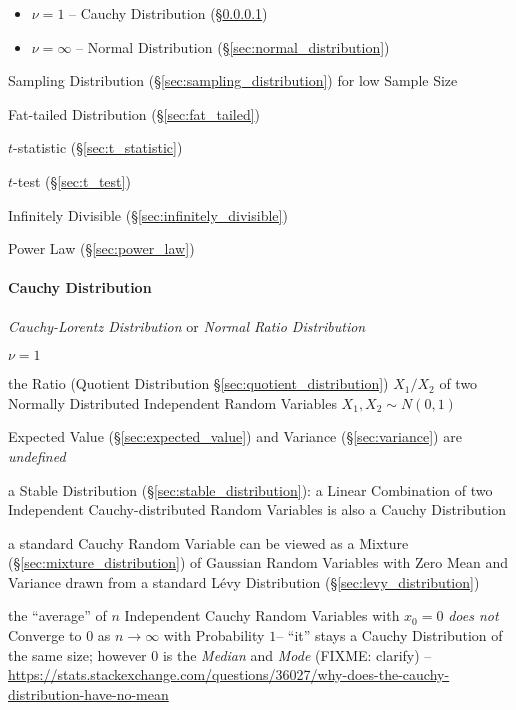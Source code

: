 \begin{itemize}
  \item $\nu = 1$ -- Cauchy Distribution (\S\ref{sec:cauchy_distribution})
  \item $\nu = \infty$ -- Normal Distribution (\S\ref{sec:normal_distribution})
\end{itemize}

Sampling Distribution (\S\ref{sec:sampling_distribution}) for low Sample Size

Fat-tailed Distribution (\S\ref{sec:fat_tailed})

$t$-statistic (\S\ref{sec:t_statistic})

$t$-test (\S\ref{sec:t_test})

Infinitely Divisible (\S\ref{sec:infinitely_divisible})

Power Law (\S\ref{sec:power_law})



\paragraph{Cauchy Distribution}\label{sec:cauchy_distribution}\hfill

\emph{Cauchy-Lorentz Distribution} or \emph{Normal Ratio Distribution}

$\nu = 1$

the Ratio (Quotient Distribution \S\ref{sec:quotient_distribution}) $X_1/X_2$ of
two Normally Distributed Independent Random Variables $X_1, X_2 \sim N(0,1)$

Expected Value (\S\ref{sec:expected_value}) and Variance (\S\ref{sec:variance})
are \emph{undefined}

a Stable Distribution (\S\ref{sec:stable_distribution}): a Linear Combination of
two Independent Cauchy-distributed Random Variables is also a Cauchy
Distribution

a standard Cauchy Random Variable can be viewed as a Mixture
(\S\ref{sec:mixture_distribution}) of Gaussian Random Variables with Zero Mean
and Variance drawn from a standard L\'evy Distribution
(\S\ref{sec:levy_distribution})

the ``average'' of $n$ Independent Cauchy Random Variables with $x_0 = 0$
\emph{does not} Converge to $0$ as $n \to \infty$ with Probability $1$-- ``it''
stays a Cauchy Distribution of the same size; however $0$ is the \emph{Median}
and \emph{Mode} (FIXME: clarify)
--\url{https://stats.stackexchange.com/questions/36027/why-does-the-cauchy-distribution-have-no-mean}

